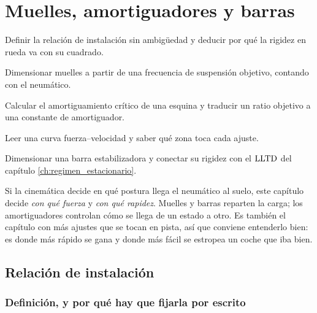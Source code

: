 \chapter{Muelles, amortiguadores y barras}
\label{ch:muelles_amortiguadores}

\begin{objetivos}
  \item Definir la relación de instalación sin ambigüedad y deducir por qué la
        rigidez en rueda va con su cuadrado.
  \item Dimensionar muelles a partir de una frecuencia de suspensión objetivo,
        contando con el neumático.
  \item Calcular el amortiguamiento crítico de una esquina y traducir un ratio
        objetivo a una constante de amortiguador.
  \item Leer una curva fuerza--velocidad y saber qué zona toca cada ajuste.
  \item Dimensionar una barra estabilizadora y conectar su rigidez con el
        $\mathrm{LLTD}$ del capítulo \ref{ch:regimen_estacionario}.
\end{objetivos}


Si la cinemática decide en qué postura llega el neumático al suelo, este
capítulo decide \emph{con qué fuerza} y \emph{con qué rapidez}. Muelles y
barras reparten la carga; los amortiguadores controlan cómo se llega de un
estado a otro. Es también el capítulo con más ajustes que se tocan en pista,
así que conviene entenderlo bien: es donde más rápido se gana y donde más
fácil se estropea un coche que iba bien.

\section{Relación de instalación}
\label{sec:muelles_amortiguadores:01}

\subsection{Definición, y por qué hay que fijarla por escrito}

